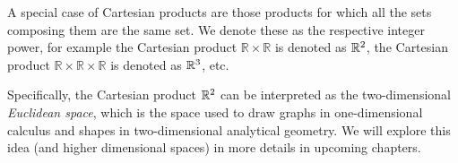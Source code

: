 A special case of Cartesian products are those products for which all the sets composing them are the same set. We denote these as the respective integer power, for example the Cartesian product $\mathbb{R}\times\mathbb{R}$ is denoted as $\mathbb{R}^{2}$, the Cartesian product $\mathbb{R}\times\mathbb{R}\times\mathbb{R}$ is denoted as $\mathbb{R}^{3}$, etc.

Specifically, the Cartesian product $\mathbb{R}^{2}$ can be interpreted as the two-dimensional \emph{Euclidean space}, which is the space used to draw graphs in one-dimensional calculus and shapes in two-dimensional analytical geometry. We will explore this idea (and higher dimensional spaces) in more details in upcoming chapters.
